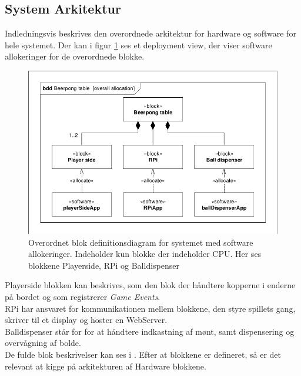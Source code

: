 \documentclass[Rapport/Rapport_main.tex]{subfiles}
\begin{document}
\subsection{System Arkitektur}
Indledningsvis beskrives den overordnede arkitektur for hardware og software for hele systemet. Der kan i figur \ref{fig:rap_systemarkitektur} ses et deployment view, der viser software allokeringer for de overordnede blokke.
\begin{figure}[H]
    \centering
    \includegraphics[width=1\textwidth,trim={0.24in 0.24in 0.24in 0.24in},clip, page=1]{Arkitektur/graphics/BDD_og_IBD.pdf}
    \caption{Overordnet blok definitionsdiagram for systemet med software allokeringer. Indeholder kun blokke der indeholder CPU. Her ses blokkene Playerside, RPi og Balldispenser}
    \label{fig:rap_systemarkitektur}
\end{figure}
Playerside blokken kan beskrives, som den blok der håndtere kopperne i enderne på bordet og som registrerer \textit{Game Events}.\\
RPi har ansvaret for kommunikationen mellem blokkene, den styre spillets gang, skriver til et display og hoster en WebServer. \\
Balldispenser står for for at håndtere indkastning af mønt, samt dispensering og overvågning af bolde.\\
De fulde blok beskrivelser kan ses i . Efter at blokkene er defineret, så er det relevant at kigge på arkitekturen af Hardware blokkene.
\end{document}

